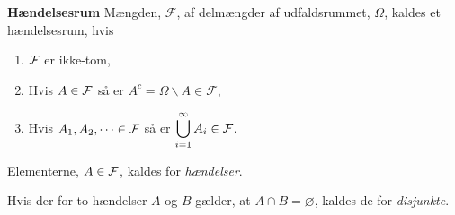 \begin{defn}\textbf{Hændelsesrum}
\newline
    Mængden, $\mathcal{F}$, af delmængder af udfaldsrummet, $\Omega$, kaldes et hændelsesrum, hvis
    \begin{enumerate}
        \item $\mathcal{F}$ er ikke-tom,
        \item Hvis $A\in\mathcal{F}$ så er $A^c=\Omega\backslash A \in \mathcal{F}$,
        \item Hvis $A_1, A_2,\dots\in \mathcal{F}$ så er $\displaystyle \bigcup_{i=1}^\infty A_i\in\mathcal{F}$.
    \end{enumerate}
Elementerne, $A\in \mathcal{F}$, kaldes for \textit{hændelser}.
\end{defn}


Hvis der for to hændelser $A$ og $B$ gælder, at $A \cap B = \varnothing$, kaldes de for \textit{disjunkte}.







